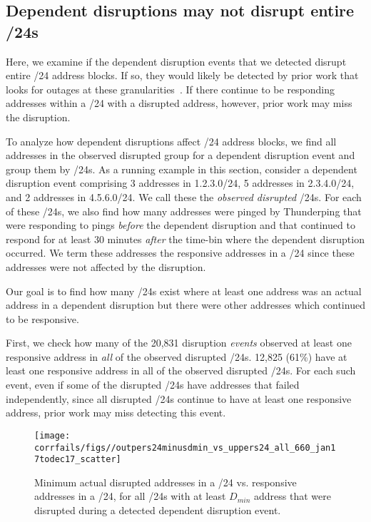 
\subsection{Dependent disruptions may not disrupt entire  /24s}

Here, we examine if the dependent disruption events that we detected
disrupt entire /24 address blocks. If so, they would likely be
detected by prior work that looks for outages at these
granularities~\cite{trinocular,advancing-outage-art}. If there
continue to be responding addresses within a /24 with a disrupted
address, however, prior work may miss the disruption.

To analyze how dependent disruptions affect /24 address blocks, we find all addresses in
the observed disrupted group for a dependent disruption event and
group them by /24s. As a running example in this section, 
consider a dependent disruption event comprising 3 addresses in 1.2.3.0/24,
5 addresses in 2.3.4.0/24, and 2 addresses in 4.5.6.0/24. We call these
the \emph{observed
disrupted} /24s. For each of these /24s, we also find how many
addresses were pinged by Thunderping that were responding to pings
\emph{before} the dependent disruption and that continued to respond for at
least 30 minutes \emph{after} the time-bin where the dependent
disruption occurred. We term these addresses the responsive addresses
in a /24 since these addresses were not affected by the
disruption. 

Our goal is to find how many /24s exist where at least one address was
an actual address in a dependent disruption but there were other
addresses which continued to be responsive. 

First, we check how many of the 20,831 disruption
\emph{events} observed at least one responsive address in \emph{all} of the observed
disrupted /24s. 12,825 (61\%) have at least one
responsive address in all of the observed disrupted /24s. For each such event, even if
some of the disrupted /24s have addresses that failed independently,
since all disrupted /24s continue to have at least one responsive address,
prior work may miss detecting this event.

\begin{figure}[t]
\centering
\texttt{[image: corrfails/figs//outpers24minusdmin\_vs\_uppers24\_all\_660\_jan17todec17\_scatter]}
\caption[Minimum actual disrupted addresses in a /24 vs. responsive addresses in a /24]{
\label{fig:outpers24minusdmin_vs_uppers24_all}
Minimum actual disrupted addresses in a /24 vs. responsive addresses in a /24, for all /24s with
at least $D_{min}$ address that were disrupted during a detected dependent
disruption event.}
\end{figure}

